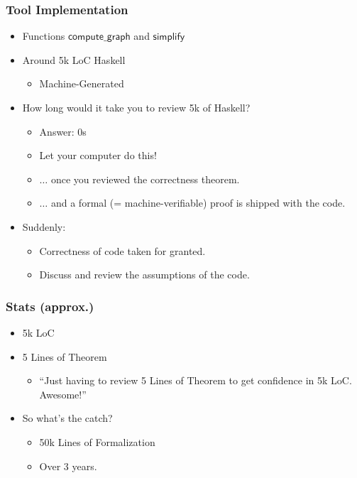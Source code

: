 \documentclass[aspectratio=169,t]{beamer}
\newcommand{\mdef}[1]{\ensuremath{\mathsf{#1}}}
\newcommand{\mfun}[1]{\mdef{#1}}
\begin{document}
\begin{frame}
	\frametitle{Tool Implementation}
	\vspace*{5ex}
		\begin{itemize}
			\item Functions \alert{$\mfun{compute\_graph}$} and \alert{$\mfun{simplify}$}
			\item<2-> Around 5k LoC Haskell
			\begin{itemize}
				\item<3-> Machine-Generated
			\end{itemize}
			\item<4-> How long would it take you to review 5k of  Haskell?
			\begin{itemize}
				\item<6-> Answer: 0s
				\item<7-> Let your computer do this!
				\item<8-> $\dots$ once you reviewed the correctness theorem.
				\item<9-> $\dots$ and a formal (= machine-verifiable) proof is shipped with the code.
			\end{itemize}
			\item<10-> Suddenly:
			\begin{itemize}
				\item Correctness of code \alert{taken for granted}.
				\item Discuss and review the \alert{assumptions} of the code.
			\end{itemize}
		\end{itemize}
\end{frame}



\begin{frame}
	\frametitle{Stats (approx.)}
	\vspace*{5ex}
	\begin{itemize}
		\item 5k LoC
		\item 5 Lines of Theorem
		\begin{itemize}
			\item<2-> ``Just having to review 5 Lines of Theorem to get confidence in 5k LoC. Awesome!''
		\end{itemize}
		\item<3-> So what's the catch?
		\begin{itemize}
			\item<4-> 50k Lines of Formalization
			\item<4-> Over 3 years.
		\end{itemize}
	\end{itemize}
\end{frame}
\end{document}

